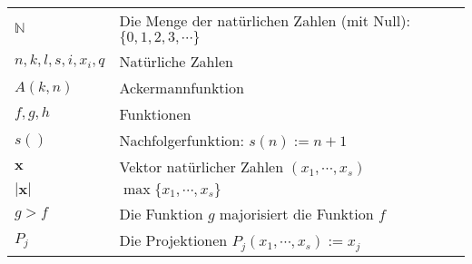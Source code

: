 \documentclass[a4paper]{amsart}
\theoremstyle{definition}
\newcommand{\N}{\ensuremath{\mathbb{ N }}}
\newcommand{\bb}[1]{\mathbf{#1}}
\begin{document}
\renewcommand*{\arraystretch}{1}

\begin{tabular}{ll}
    $\N$                    & Die Menge der natürlichen Zahlen (mit Null): $\{ 0, 1, 2, 3, \cdots \}$\\
    $n, k, l, s, i, x_i, q$ & Natürliche Zahlen\\
    $A( k, n )$             & Ackermannfunktion\\
    $f, g, h$               & Funktionen\\
    $s()$                   & Nachfolgerfunktion: $s(n) := n+1$\\
    $\bb{x}$                & Vektor natürlicher Zahlen $(x_1, \cdots, x_s)$\\
    $|\bb{x}|$              & $\max \{x_1, \cdots, x_s \}$\\
    $g > f$                 & Die Funktion $g$ majorisiert die Funktion $f$\\
    $P_j$                   & Die Projektionen $P_j(x_1, \cdots, x_s ) := x_j$
\end{tabular}
\end{document}
